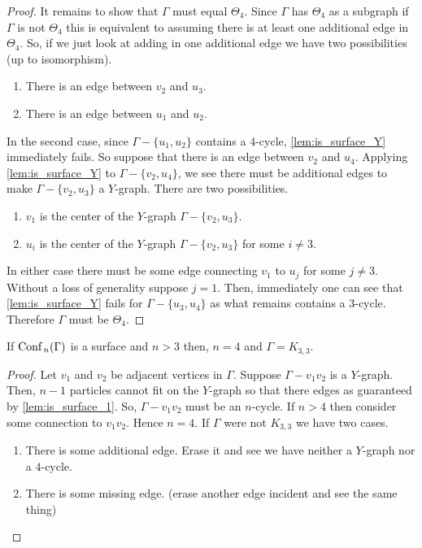 \begin{proof}
    It remains to show that \(\Gamma\) must equal \(\Theta_4\). Since \(\Gamma\) has \(\Theta_4\) as a subgraph
    if \(\Gamma\) is not \(\Theta_4\) this is equivalent to assuming there is at least one additional edge in \(\Theta_4\).
    So, if we just look at adding in one additional edge we have two possibilities (up to isomorphism).
    \begin{enumerate}
        \item There is an edge between \(v_2\) and \(u_3\).
        \item There is an edge between \(u_1\) and \(u_2\).
    \end{enumerate}
    In the second case, since \(\Gamma - \{u_1, u_2\}\) contains a \(4\)-cycle, \ref{lem:is_surface_Y} immediately fails.
    So suppose that there is an edge between \(v_2\) and \(u_4\).
    Applying \ref{lem:is_surface_Y} to \(\Gamma - \{v_2, u_4\}\), we see there must be additional edges to make \(\Gamma - \{v_2, u_3\}\)
    a \(Y\)-graph.
    There are two possibilities.
    \begin{enumerate}
        \item \(v_1\) is the center of the \(Y\)-graph \(\Gamma - \{v_2, u_3\}\).
        \item \(u_i\) is the center of the \(Y\)-graph \(\Gamma - \{v_2, u_3\}\) for some \(i \neq 3\).
    \end{enumerate}
    In either case there must be some edge connecting \(v_1\) to \(u_j\) for some \(j \neq 3\).
    Without a loss of generality suppose \(j = 1\).
    Then, immediately one can see that \ref{lem:is_surface_Y} fails for \(\Gamma - \{u_3, u_4\}\)
    as what remains contains a \(3\)-cycle.
    Therefore \(\Gamma\) must be \(\Theta_4\).
\end{proof}

\begin{thm}
    If \(\text{Conf}\,_n(\Gamma)\) is a surface and \(n > 3\) then, \(n = 4\) and \(\Gamma = K_{3,3}\).
\end{thm}
\begin{proof}
    Let \(v_1\) and \(v_2\) be adjacent vertices in \(\Gamma\).
    Suppose \(\Gamma - v_1 v_2\) is a \(Y\)-graph.
    Then, \(n-1\) particles cannot fit on the \(Y\)-graph so that there edges as guaranteed by \ref{lem:is_surface_1}.
    So, \(\Gamma - v_1 v_2\) must be an \(n\)-cycle.
    If \(n > 4\) then consider some connection to \(v_1 v_2\).
    Hence \(n = 4\).
    If \(\Gamma\) were not \(K_{3,3}\) we have two cases.
    \begin{enumerate}
        \item There is some additional edge. Erase it and see we have neither a \(Y\)-graph nor a \(4\)-cycle.
        \item There is some missing edge. (erase another edge incident and see the same thing)
    \end{enumerate}

\end{proof}

